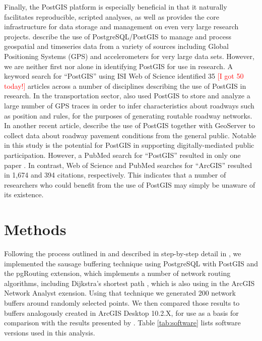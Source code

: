 \documentclass[11pt,letterpaper]{article} %
\begin{document}
Finally, the PostGIS platform is especially beneficial in that it
naturally facilitates reproducible, scripted analyses, as well as 
provides the core infrastructure for data storage and management on even very large research
projects. \textcite{hurvitz2014emerging} describe the use of
PostgreSQL/PostGIS to manage and process geospatial and timeseries
data from a variety of sources including Global Positioning Systems (GPS) and
accelerometers for very large data sets. However, we are neither first nor alone in identifying
PostGIS for use in research. A keyword search for ``PostGIS'' using
ISI Web of Science identified 35 \textcolor{red}{[I got 50 today!]} articles across a number of
disciplines describing the use of PostGIS in research. In the
transportation sector, \textcite{Wang2015routable} also used PostGIS
to store and analyze a large number of GPS traces in order to infer
characteristics about roadways such as position and rules, for the
purposes of generating routable roadway networks. In another recent
article, \textcite{Brovelli2015FOSS} describe the use of PostGIS
together with GeoServer to collect data about roadway pavement
conditions from the general public. Notable in this study is the
potential for PostGIS in supporting digitally-mediated public
participation. However, a PubMed search for ``PostGIS'' resulted in only one paper \parencite{Rowlingson2013}. In contrast, Web of Science and PubMed searches for ``ArcGIS'' resulted in 1,674 and 394 citations, respectively. This indicates that a number of researchers who could benefit from the use of PostGIS may simply be unaware of its existence.


\section*{Methods}
Following the process outlined in 
\textcite{Forsyth2014sausage} and described in step-by-step detail in \textcite{ Forsyth2012proto}, we implemented the
sausage buffering technique using PostgreSQL 
with PostGIS and the pgRouting \parencite{pgRoutingContributors2013} extension, which implements a number of network routing algorithms, including Dijkstra's shortest path \parencite{Dijkstra1959}, which is also using in the ArcGIS Network Analyst exension. Using that technique we
generated 200 network buffers around randomly selected points. We then
compared those results to buffers analogously created in ArcGIS Desktop
10.2.X, for use as a basis for comparison with the results presented
by \citeauthor{Forsyth2014sausage}. Table \ref{tab:software} lists
software versions used in this analysis.
\end{document}
